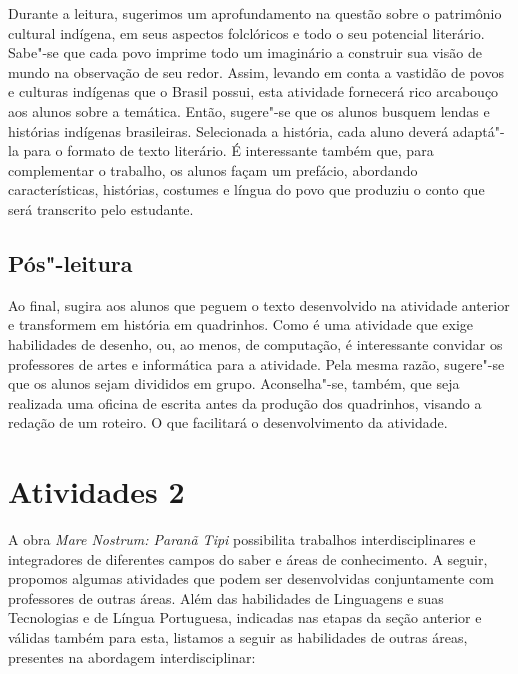 \documentclass[12pt]{extarticle}
\begin{document}

Durante a leitura, sugerimos um aprofundamento na questão
sobre o patrimônio cultural indígena, em seus aspectos folclóricos e
todo o seu potencial literário. Sabe"-se que cada povo imprime todo um
imaginário a construir sua visão de mundo na observação de seu redor.
Assim, levando em conta a vastidão de povos e culturas indígenas que o
Brasil possui, esta atividade fornecerá rico arcabouço aos alunos sobre
a temática. Então, sugere"-se que os alunos busquem lendas e histórias
indígenas brasileiras. Selecionada a história, cada aluno deverá
adaptá"-la para o formato de texto literário. É interessante também que,
para complementar o trabalho, os alunos façam um prefácio, abordando
características, histórias, costumes e língua do povo que produziu o
conto que será transcrito pelo estudante.

\subsection{Pós"-leitura}


Ao final, sugira aos alunos que peguem o texto desenvolvido
na atividade anterior e transformem em história em quadrinhos. Como é
uma atividade que exige habilidades de desenho, ou, ao menos, de
computação, é interessante convidar os professores de artes e
informática para a atividade. Pela mesma razão, sugere"-se que os alunos
sejam divididos em grupo. Aconselha"-se, também, que seja realizada uma
oficina de escrita antes da produção dos quadrinhos, visando a redação
de um roteiro. O que facilitará o desenvolvimento da atividade.


\section{Atividades 2}

A obra \emph{Mare Nostrum: Paranã Tipi} possibilita trabalhos
interdisciplinares e integradores de diferentes campos do saber e áreas
de conhecimento. A seguir, propomos algumas atividades que podem ser
desenvolvidas conjuntamente com professores de outras áreas. Além das
habilidades de Linguagens e suas Tecnologias e de Língua Portuguesa,
indicadas nas etapas da seção anterior e válidas também para esta,
listamos a seguir as habilidades de outras áreas, presentes na abordagem
interdisciplinar:
\end{document}
